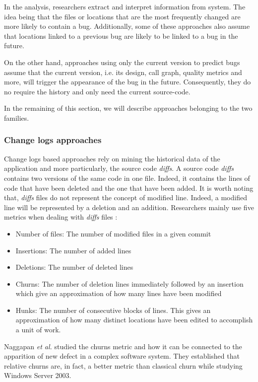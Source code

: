 In the  analysis, researchers extract and interpret information from  system.
The idea being that the files or locations that are the most frequently changed are more likely to contain a bug.
Additionally, some of these approaches also assume that locations linked to a previous bug are likely to be linked to a bug in the future.

On the other hand, approaches using only the current version to predict bugs assume that the current version, i.e. its design, call graph, quality metrics and more, will trigger the appearance of the bug in the future.
Consequently, they do no require the history and only need the current source-code.

In the remaining of this section, we will describe approaches belonging to the two families.

\subsubsection{Change logs approaches}
\label{subs:Change logs approaches}

Change logs based approaches rely on mining the historical data of the application and more particularly, the source code \textit{diffs}.
A source code \textit{diffs} contains two versions of the same code in one file.
Indeed, it contains the lines of code that have been deleted and the one that have been added.
It is worth noting that, \textit{diffs} files do not represent the concept of modified line.
Indeed, a modified line will be represented by a deletion and an addition.
Researchers mainly use five metrics when dealing with \textit{diffs} files :

\begin{itemize}
  \item Number of files: The number of modified files in a given commit
  \item Insertions: The number of added lines
  \item Deletions: The number of deleted lines
  \item Churns: The number of deletion lines immediately followed by an insertion which give an approximation of how many lines have been modified
  \item Hunks: The number of consecutive blocks of lines. This gives an approximation of how many distinct locations have been edited to accomplish a unit of work.
\end{itemize}

Naggapan \textit{et al.} studied the churns metric and how it can be connected to the apparition of new defect in a complex software system.
They established that relative churns are, in fact, a better metric than classical churn \cite{Nagappan} while studying Windows Server 2003.

